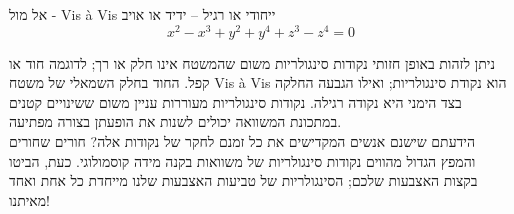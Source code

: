 \begin{surferPage}{אל מול - Vis \`a Vis}
ייחודי או רגיל – ידיד או אויב
\smallskip
\[x^2	- x^3+ y^2+ y^4+ z^3- z^4	=  0\]

\vspace{0,3cm}
ניתן לזהות באופן חזותי נקודות סינגולריות משום שהמשטח אינו חלק או רך; לדוגמה חוד או קפל.
\vspace{0,3cm}
החוד בחלק השמאלי של משטח Vis \`a Vis הוא נקודת סינגולריות; ואילו הגבעה החלקה בצד הימני היא נקודה רגילה. נקודות סינגולריות מעוררות עניין משום ששינויים קטנים במתכונת המשוואה יכולים לשנות את הופעתן בצורה מפתיעה. \\

\vspace{0,3cm}
הידעתם שישנם אנשים המקדישים את כל זמנם לחקר של נקודות אלה? חורים שחורים והמפץ הגדול מהווים נקודות סינגולריות של משוואות בקנה מידה קוסמולוגי. כעת, הביטו בקצות האצבעות שלכם; הסינגולריות של טביעות האצבעות שלנו מייחדת כל אחת ואחד מאיתנו!
\end{surferPage}
